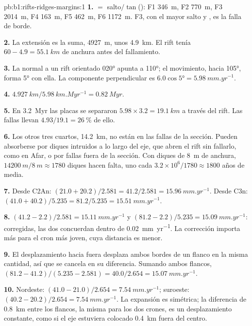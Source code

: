\begin{solution}{pb:b1:rifts-ridges-margins:1}
\textbf{1.}  $= $ salto$/\tan$(): F1 \qty{346}{m}, F2 \qty{770}{m},
F3 \qty{2014}{m}, F4 \qty{163}{m}, F5 \qty{462}{m}, F6 \qty{1172}{m}. F3, con
el mayor salto y , es la falla de borde.

\textbf{2.} La extensión es la suma, \qty{4927}{m}, unos \qty{4.9}{km}. El
rift tenía $60 - 4.9 = \qty{55.1}{km}$ de anchura antes del fallamiento.

\textbf{3.} La normal a un rift orientado \ang{020} apunta a \ang{110}; el
movimiento, hacia \ang{105}, forma \ang{5} con ella. La componente perpendicular es
$6.0\cos\ang{5} = \qty{5.98}{mm.yr^{-1}}$.

\textbf{4.} $\qty{4.927}{km}/\qty{5.98}{km.Myr^{-1}} = \qty{0.82}{Myr}$.

\textbf{5.} En \qty{3.2}{Myr} las placas se separaron
$5.98\times3.2 = \qty{19.1}{km}$ a través del rift. Las fallas llevan
$4.93/19.1 = \qty{26}{\percent}$ de ello.

\textbf{6.} Los otros tres cuartos, \qty{14.2}{km}, no están en las fallas de la sección. Pueden absorberse por diques intruidos a lo
largo del eje, que abren el rift sin fallarlo, como en Afar, o por fallas fuera de la sección. Con diques de \qty{8}{m} de anchura,
$\qty{14200}{m}/\qty{8}{m} \approx 1780$ diques hacen falta, uno cada $3.2\times10^6/1780 \approx 1800$ años de media.

\textbf{7.} Desde C2An: $(21.0 + 20.2)/2.581 = 41.2/2.581 =
\qty{15.96}{mm.yr^{-1}}$. Desde C3n: $(41.0 + 40.2)/5.235 = 81.2/5.235 =
\qty{15.51}{mm.yr^{-1}}$.

\textbf{8.} $(41.2 - 2.2)/2.581 = \qty{15.11}{mm.yr^{-1}}$ y
$(81.2 - 2.2)/5.235 = \qty{15.09}{mm.yr^{-1}}$: corregidas, las dos concuerdan dentro de
\qty{0.02}{mm.yr^{-1}}. La corrección importa más para el cron más joven, cuya
distancia es menor.

\textbf{9.} El desplazamiento hacia fuera desplaza ambos bordes de un flanco en la misma cantidad, así que se cancela en su diferencia.
Sumando ambos flancos,
$(81.2 - 41.2)/(5.235 - 2.581) = 40.0/2.654 = \qty{15.07}{mm.yr^{-1}}$.

\textbf{10.} Nordeste: $(41.0 - 21.0)/2.654 = \qty{7.54}{mm.yr^{-1}}$;
suroeste: $(40.2 - 20.2)/2.654 = \qty{7.54}{mm.yr^{-1}}$. La expansión es
simétrica; la diferencia de \qty{0.8}{km} entre los flancos, la misma para los dos crones, es un desplazamiento constante, como si el eje
estuviera colocado \qty{0.4}{km} fuera del centro.


\end{solution}
